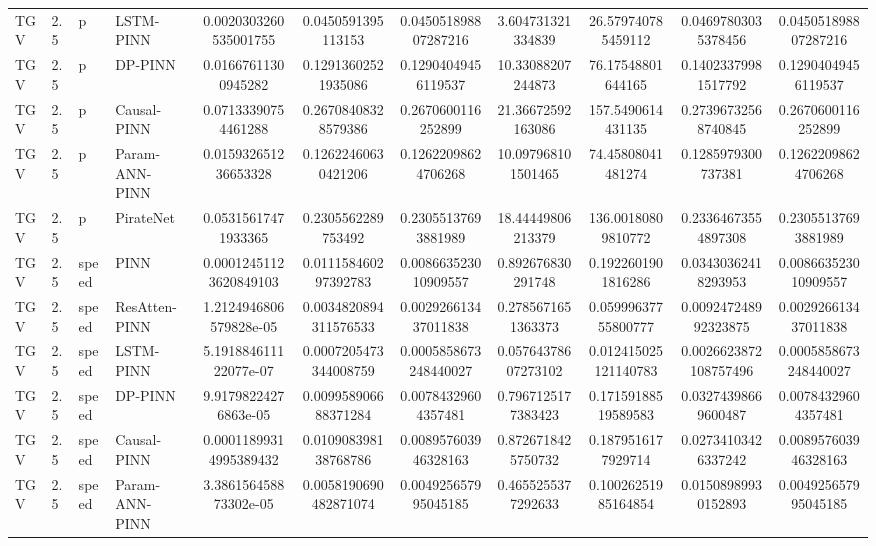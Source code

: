 \begin{landscape}
\begin{longtable}{llllccccccc}
 TGV &    2.5 &     p &      LSTM-PINN &  0.0020303260535001755 &     0.0450591395113153 &   0.045051898807287216 &    3.604731321334839 &    26.579740785459112 &   0.04697803035378456 &   0.045051898807287216 \\
 TGV &    2.5 &     p &        DP-PINN &    0.01667611300945282 &    0.12913602521935086 &    0.12904049456119537 &    10.33088207244873 &     76.17548801644165 &   0.14023379981517792 &    0.12904049456119537 \\
 TGV &    2.5 &     p &    Causal-PINN &    0.07133390754461288 &    0.26708408328579386 &     0.2670600116252899 &    21.36672592163086 &     157.5490614431135 &   0.27396732568740845 &     0.2670600116252899 \\
 TGV &    2.5 &     p & Param-ANN-PINN &   0.015932651236653328 &    0.12622460630421206 &    0.12622098624706268 &   10.097968101501465 &     74.45808041481274 &    0.1285979300737381 &    0.12622098624706268 \\
 TGV &    2.5 &     p &      PirateNet &    0.05315617471933365 &     0.2305562289753492 &    0.23055137693881989 &    18.44449806213379 &    136.00180809810772 &   0.23364673554897308 &    0.23055137693881989 \\
 TGV &    2.5 & speed &           PINN & 0.00012451123620849103 &   0.011158460297392783 &   0.008663523010909557 &    0.892676830291748 &    0.1922601901816286 &   0.03430362418293953 &   0.008663523010909557 \\
 TGV &    2.5 & speed &  ResAtten-PINN & 1.2124946806579828e-05 &  0.0034820894311576533 &   0.002926613437011838 &   0.2785671651363373 &   0.05999637755800777 &  0.009247248992323875 &   0.002926613437011838 \\
 TGV &    2.5 & speed &      LSTM-PINN &  5.191884611122077e-07 &  0.0007205473344008759 &  0.0005858673248440027 &  0.05764378607273102 &  0.012415025121140783 & 0.0026623872108757496 &  0.0005858673248440027 \\
 TGV &    2.5 & speed &        DP-PINN &   9.91798224276863e-05 &   0.009958906688371284 &    0.00784329604357481 &   0.7967125177383423 &   0.17159188519589583 &   0.03274398669600487 &    0.00784329604357481 \\
 TGV &    2.5 & speed &    Causal-PINN & 0.00011899314995389432 &   0.010908398138768786 &   0.008957603946328163 &   0.8726718425750732 &    0.1879516177929714 &   0.02734103426337242 &   0.008957603946328163 \\
 TGV &    2.5 & speed & Param-ANN-PINN &  3.386156458873302e-05 &  0.0058190690482871074 &   0.004925657995045185 &   0.4655255377292633 &   0.10026251985164854 &   0.01508989930152893 &   0.004925657995045185 \\

\end{longtable}
\end{landscape}

